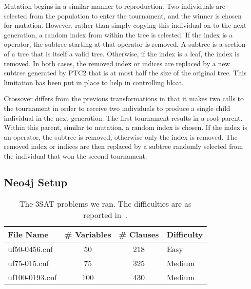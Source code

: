 \documentclass[12pt]{article}
\begin{document}
Mutation begins in a similar manner to reproduction. Two individuals are selected from the population to enter the tournament, and the winner is chosen for mutation. However, rather than simply copying this individual on to the next generation, a random index from within the tree is selected. If the index is a operator, the subtree starting at that operator is removed. A subtree is a section of a tree that is itself a valid tree. Otherwise, if the index is a leaf, the index is removed. In both cases, the removed index or indices are replaced by a new subtree generated by PTC2 that is at most half the size of the original tree. This limitation has been put in place to help in controlling bloat.

Crossover differs from the previous transformations in that it makes two calls to the tournament in order to receive two individuals to produce a single child individual in the next generation. The first tournament results in a root parent. Within this parent, similar to mutation, a random index is chosen. If the index is an operator, the subtree is removed, otherwise only the index is removed. The removed index or indices are then replaced by a subtree randomly selected from the individual that won the second tournament.

\subsection{Neo4j Setup}
\label{sec:Neo4jSetup}






\begin{table}[tb]
\begin{center}
\begin{tabular}{lccl}
	\textbf{File Name} & \textbf{\# Variables} & \textbf{\# Clauses} & \textbf{Difficulty} \\ \hline
	uf50-0456.cnf & 50 & 218 & Easy \\
	uf75-015.cnf & 75 & 325 & Medium \\
	uf100-0193.cnf & 100 & 430 & Medium \\
\end{tabular}
\caption{The 3SAT problems we ran. The difficulties are as reported in~\cite{ellgren:2011}.}
\label{tab:problemFiles}
\end{center}
\end{table}
\end{document}
